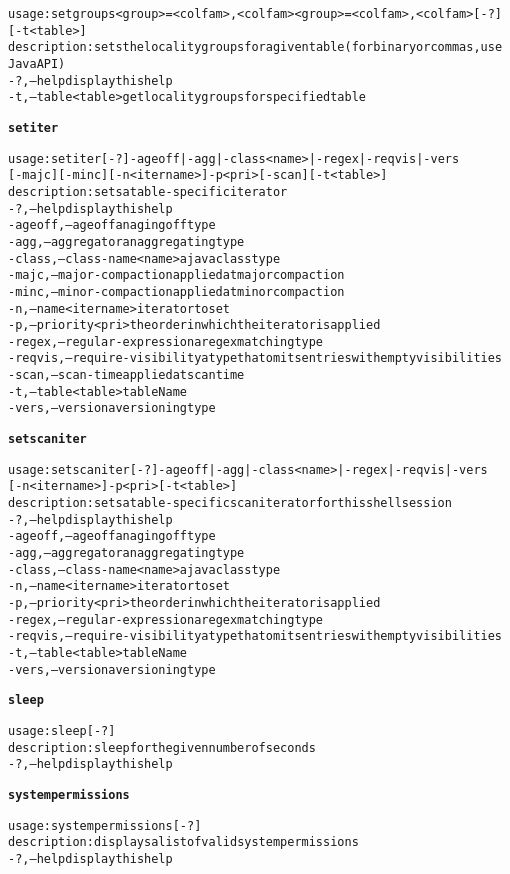 \begin{alltt}
    usage: setgroups <group>=<col fam>{,<col fam>}{ <group>=<col fam>{,<col fam>}} [-?]
              [-t <table>]
    description: sets the locality groups for a given table (for binary or commas, use
              Java API)
      -?,--help  display this help
      -t,--table <table>  get locality groups for specified table

\textbf{setiter}

    usage: setiter [-?] -ageoff | -agg | -class <name> | -regex | -reqvis | -vers 
              [-majc] [-minc] [-n <itername>] -p <pri>  [-scan] [-t <table>]
    description: sets a table-specific iterator
      -?,--help  display this help
      -ageoff,--ageoff  an aging off type
      -agg,--aggregator  an aggregating type
      -class,--class-name <name>  a java class type
      -majc,--major-compaction  applied at major compaction
      -minc,--minor-compaction  applied at minor compaction
      -n,--name <itername>  iterator to set
      -p,--priority <pri>  the order in which the iterator is applied
      -regex,--regular-expression  a regex matching type
      -reqvis,--require-visibility  a type that omits entries with empty visibilities
      -scan,--scan-time  applied at scan time
      -t,--table <table>  tableName
      -vers,--version  a versioning type

\textbf{setscaniter}

    usage: setscaniter [-?] -ageoff | -agg | -class <name> | -regex | -reqvis | -vers 
              [-n <itername>] -p <pri>  [-t <table>]
    description: sets a table-specific scan iterator for this shell session
      -?,--help  display this help
      -ageoff,--ageoff  an aging off type
      -agg,--aggregator  an aggregating type
      -class,--class-name <name>  a java class type
      -n,--name <itername>  iterator to set
      -p,--priority <pri>  the order in which the iterator is applied
      -regex,--regular-expression  a regex matching type
      -reqvis,--require-visibility  a type that omits entries with empty visibilities
      -t,--table <table>  tableName
      -vers,--version  a versioning type

\textbf{sleep}

    usage: sleep [-?]
    description: sleep for the given number of seconds
      -?,--help  display this help

\textbf{systempermissions}

    usage: systempermissions [-?]
    description: displays a list of valid system permissions
      -?,--help  display this help


\end{alltt}
